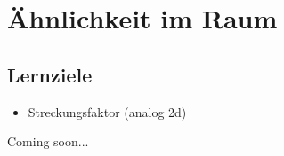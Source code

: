 \section{Ähnlichkeit im Raum}
\sectuntertitel{}


\subsection*{Lernziele}
\begin{itemize}
\item Streckungsfaktor (analog 2d)
\end{itemize}

Coming soon...
